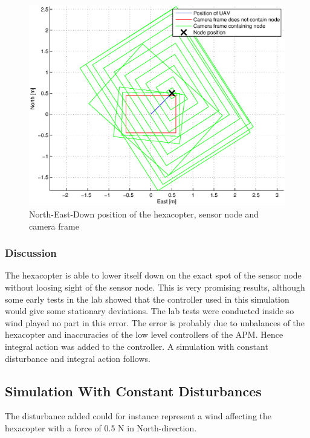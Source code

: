 \begin{figure}[H]
\centering
\includegraphics[width = 12cm]{fig/plots/simulation/positionFrameNoDisturbance.eps}
\caption{North-East-Down position of the hexacopter, sensor node and camera frame}
\label{posFrameNoDisturbance}
\end{figure}
\subsubsection{Discussion}
The hexacopter is able to lower itself down on the exact spot of the sensor node without loosing sight of the sensor node. This is very promising results, although some early tests in the lab showed that the controller used in this simulation would give some stationary deviations. The lab tests were conducted inside so wind played no part in this error. The error is probably due to unbalances of the hexacopter and inaccuracies of the low level controllers of the APM. Hence integral action was added to the controller. A simulation with constant disturbance and integral action follows.
\subsection{Simulation With Constant Disturbances}
The disturbance added could for instance represent a wind affecting the hexacopter with a force of 0.5 N in North-direction.
